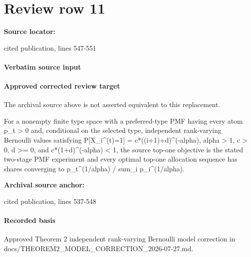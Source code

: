 \documentclass[10pt]{article}
\begin{document}
\section*{Review row 11}
\textbf{Source locator:} {\footnotesize\raggedright cited publication, lines 547-\allowbreak{}551\par}
\paragraph{Verbatim source input}
\begin{ReviewVerbatim}
\end{ReviewVerbatim}

\paragraph{Approved corrected review target}
The archival source above is not asserted equivalent to this replacement.
\begin{ReviewVerbatim}
For a nonempty finite type space with a preferred-type PMF having every atom p_t > 0 and, conditional on the selected type, independent rank-varying Bernoulli values satisfying P[X_i^(t)=1] = c*((i+1)+d)^(-alpha), alpha > 1, c > 0, d >= 0, and c*(1+d)^(-alpha) < 1, the source top-one objective is the stated two-stage PMF experiment and every optimal top-one allocation sequence has shares converging to p_t^(1/alpha) / sum_i p_i^(1/alpha).
\end{ReviewVerbatim}

\textbf{Archival source anchor:} {\footnotesize\raggedright cited publication, lines 537-\allowbreak{}548\par}
\paragraph{Recorded basis}
Approved Theorem 2 independent rank-\allowbreak{}varying Bernoulli model correction in docs/\allowbreak{}THEOREM2\_\allowbreak{}MODEL\_\allowbreak{}CORRECTION\_\allowbreak{}2026-\allowbreak{}07-\allowbreak{}27.\allowbreak{}md.\allowbreak{}
\end{document}
